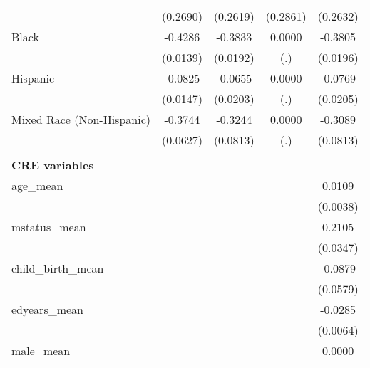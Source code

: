 {\begin{tabular}{l*{4}{c}}
                    &    (0.2690)         &    (0.2619)         &    (0.2861)         &    (0.2632)         \\
Black               &     -0.4286\sym{***}&     -0.3833\sym{***}&      0.0000         &     -0.3805\sym{***}\\
                    &    (0.0139)         &    (0.0192)         &         (.)         &    (0.0196)         \\
Hispanic            &     -0.0825\sym{***}&     -0.0655\sym{**} &      0.0000         &     -0.0769\sym{***}\\
                    &    (0.0147)         &    (0.0203)         &         (.)         &    (0.0205)         \\
Mixed Race (Non-Hispanic)&     -0.3744\sym{***}&     -0.3244\sym{***}&      0.0000         &     -0.3089\sym{***}\\
                    &    (0.0627)         &    (0.0813)         &         (.)         &    (0.0813)         \\
\\ \textbf{CRE variables}&                     &                     &                     &                     \\
age\_mean            &                     &                     &                     &      0.0109\sym{**} \\
                    &                     &                     &                     &    (0.0038)         \\
mstatus\_mean        &                     &                     &                     &      0.2105\sym{***}\\
                    &                     &                     &                     &    (0.0347)         \\
child\_birth\_mean    &                     &                     &                     &     -0.0879         \\
                    &                     &                     &                     &    (0.0579)         \\
edyears\_mean        &                     &                     &                     &     -0.0285\sym{***}\\
                    &                     &                     &                     &    (0.0064)         \\
male\_mean           &                     &                     &                     &      0.0000         \\

\end{tabular}}
